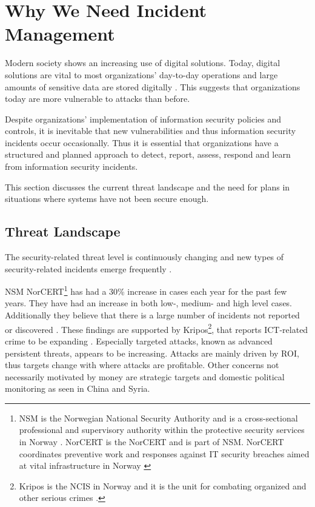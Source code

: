 \section{Why We Need Incident Management}
Modern society shows an increasing use of digital solutions. Today, digital solutions are vital to most organizations' day-to-day operations and large amounts of sensitive data are stored digitally \cite{KriposTrender}. This suggests that organizations today are more vulnerable to attacks than before. 

Despite organizations' implementation of information security policies and controls, it is inevitable that new vulnerabilities and thus information security incidents occur occasionally. Thus it is essential that organizations have a structured and planned approach to detect, report, assess, respond and learn from information security incidents. \cite{ISO/IEC27035}

This section discusses the current threat landscape and the need for plans in situations where systems have not been secure enough. 

\subsection{Threat Landscape}
The security-related threat level is continuously changing and new types of security-related incidents emerge frequently \cite{nist800-61}. %

\acs{NSM} \acs{NorCERT}\footnote{\acs{NSM} is the Norwegian National Security Authority and is a cross-sectional professional and supervisory authority within the protective security services in Norway \cite{AboutNSM}. \acs{NorCERT} is the \acl{NorCERT} and is part of \acs{NSM}. \acs{NorCERT} coordinates preventive work and responses against IT security breaches aimed at vital infrastructure in Norway \cite{AboutNorCERT}} has had a 30\% increase in cases each year for the past few years. They have had an increase in both low-, medium- and high level cases. Additionally they believe that there is a large number of incidents not reported or discovered \cite{NorCERT3Kvartal2012}. These findings are supported by Kripos\footnote{Kripos is the \ac{NCIS} in Norway and it is the unit for combating organized and other serious crimes \cite{policeInNorway}.}, that reports ICT-related crime to be expanding \cite{KriposTrender}. Especially targeted attacks, known as advanced persistent threats, appears to be increasing\cite{Morketall2012}. Attacks are mainly driven by \ac{ROI}, thus targets change with where attacks are profitable. Other concerns not necessarily motivated by money are strategic targets and domestic political monitoring as seen in China and Syria\cite{Morketall2012}.

